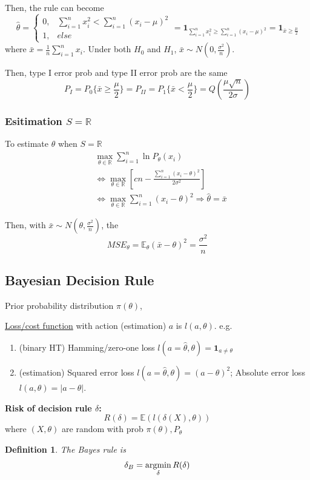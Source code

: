 \documentclass[11pt,a4paper]{article}
\newcommand{\argmin}{\operatornamewithlimits{argmin}}
\newtheorem{definition}{Definition}
\begin{document}
Then, the rule can become $$\hat{\theta}=\left\{\begin{matrix}
    0,&\sum_{i=1}^nx_i^2<\sum_{i=1}^n(x_i-\mu)^2\\
    1,&else
\end{matrix}\right.=\mathbf{1}_{\sum_{i=1}^nx_i^2\geq \sum_{i=1}^n(x_i-\mu)^2}=\mathbf{1}_{\bar{x}\geq \frac{\mu}{2}}$$
where $\bar{x}=\frac{1}{n}\sum_{i=1}^nx_i$. Under both $H_0$ and $H_1$, $\bar{x}\sim N(0,\frac{\sigma^2}{n})$.

Then, type I error prob and type II error prob are the same $$P_I=P_0\{\bar{x}\geq \frac{\mu}{2}\}=P_{II}=P_1\{\bar{x}< \frac{\mu}{2}\}=Q\left(\frac{\mu\sqrt{n}}{2\sigma}\right)$$

\subsubsection*{Esitimation $S=\mathbb{R}$}
To estimate $\theta$ when $S=\mathbb{R}$
\begin{equation}
    \begin{aligned}
        &\max_{\theta\in \mathbb{R}}\sum_{i=1}^n\ln P_\theta(x_i)\\
        &\Leftrightarrow \max_{\theta\in \mathbb{R}} \left[cn-\frac{\sum_{i=1}^n(x_i-\theta)^2}{2\sigma^2}\right]\\
        &\Leftrightarrow \max_{\theta\in \mathbb{R}} \sum_{i=1}^n(x_i-\theta)^2 \Rightarrow \hat{\theta}=\bar{x}
    \end{aligned}
    \nonumber
\end{equation}

Then, with $\bar{x}\sim N(\theta,\frac{\sigma^2}{n})$, the $$MSE_\theta=\mathbb{E}_\theta\left(\bar{x}-\theta\right)^2=\frac{\sigma^2}{n}$$

\subsection{Bayesian Decision Rule}
Prior probability distribution $\pi(\theta)$,

\underline{Loss/cost function} with action (estimation) $a$ is $l(a,\theta)$. e.g.
\begin{enumerate}
    \item (binary HT) Hamming/zero-one loss $l(a=\hat{\theta},\theta)=\mathbf{1}_{a\neq \theta}$
    \item (estimation) Squared error loss $l(a=\hat{\theta},\theta)=(a-\theta)^2$; Absolute error loss $l(a,\theta)=|a-\theta|$.
\end{enumerate}

\textbf{Risk of decision rule $\delta$:} $$R(\delta)=\mathbb{E}\left(l(\delta(X),\theta)\right)$$ where $(X,\theta)$ are random with prob $\pi(\theta),P_\theta$

\begin{definition}
The Bayes rule is $$\delta_B=\argmin_\delta R(\delta)$$
\end{definition}
\end{document}
